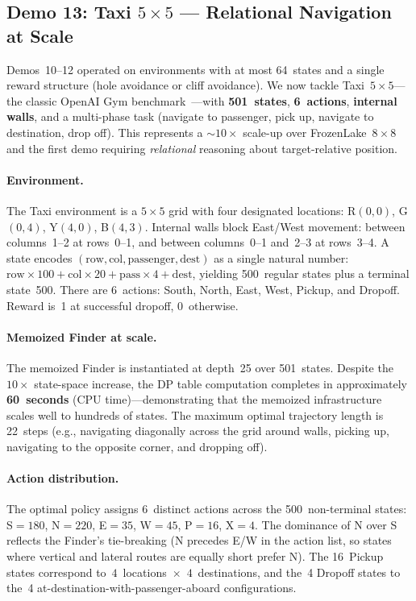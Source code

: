 \subsection{Demo 13: Taxi \texorpdfstring{$5 \times 5$}{5x5} --- Relational Navigation at Scale}
\label{sec:e2e-taxi}

Demos~10--12 operated on environments with at most 64~states and a single reward structure (hole avoidance or cliff avoidance).  We now tackle Taxi~$5{\times}5$---the classic OpenAI Gym benchmark~\cite{dietterich2000hierarchical}---with \textbf{501~states}, \textbf{6~actions}, \textbf{internal walls}, and a multi-phase task (navigate to passenger, pick up, navigate to destination, drop off).  This represents a ${\sim}10\times$ scale-up over FrozenLake~$8{\times}8$ and the first demo requiring \emph{relational} reasoning about target-relative position.

\paragraph{Environment.}
The Taxi environment is a $5 \times 5$ grid with four designated locations: R$(0{,}0)$, G$(0{,}4)$, Y$(4{,}0)$, B$(4{,}3)$.  Internal walls block East/West movement: between columns~1--2 at rows~0--1, and between columns~0--1 and~2--3 at rows~3--4.  A state encodes $(\text{row}, \text{col}, \text{passenger}, \text{dest})$ as a single natural number: $\text{row} \times 100 + \text{col} \times 20 + \text{pass} \times 4 + \text{dest}$, yielding 500~regular states plus a terminal state~500.  There are 6~actions: South, North, East, West, Pickup, and Dropoff.  Reward is~1 at successful dropoff, 0~otherwise.

\paragraph{Memoized Finder at scale.}
The memoized Finder is instantiated at depth~25 over 501~states.  Despite the $10\times$ state-space increase, the DP table computation completes in approximately \textbf{60~seconds} (CPU time)---demonstrating that the memoized infrastructure scales well to hundreds of states.  The maximum optimal trajectory length is 22~steps (e.g., navigating diagonally across the grid around walls, picking up, navigating to the opposite corner, and dropping off).

\paragraph{Action distribution.}
The optimal policy assigns 6~distinct actions across the 500~non-terminal states: S${}=180$, N${}=220$, E${}=35$, W${}=45$, P${}=16$, X${}=4$.  The dominance of N over S reflects the Finder's tie-breaking (N precedes E/W in the action list, so states where vertical and lateral routes are equally short prefer N).  The 16~Pickup states correspond to~$4$~locations~$\times$~$4$~destinations, and the~4 Dropoff states to the~4 at-destination-with-passenger-aboard configurations.

